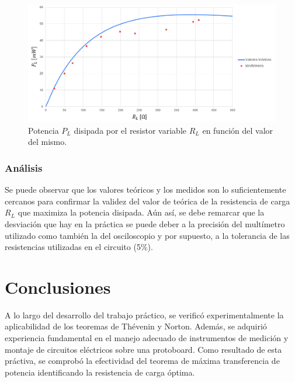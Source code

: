 \documentclass{article}
\begin{document}
            \begin{figure}[H]
                \centering
                \includegraphics[width=1\textwidth]{graficoPotencia.png}
                \caption{Potencia $P_L$ disipada por el resistor variable $R_L$ en función del valor del mismo.}
                \label{fig:graficoTransferenciaPotencia}
            \end{figure}

            

            \subsubsection{Análisis}
            \quad Se puede observar que los valores teóricos y los medidos son lo suficientemente cercanos para confirmar 
            la validez del valor de teórica de la resistencia de carga $R_L$ que maximiza la potencia disipada.
            Aún así, se debe remarcar que la desviación que hay en la práctica se puede deber a la precisión del multímetro utilizado como también la del osciloscopio
            y por supuesto, a la tolerancia de las resistencias utilizadas en el circuito (5\%).
    \section{Conclusiones}

    \quad A lo largo del desarrollo del trabajo práctico, se verificó experimentalmente
     la aplicabilidad de los teoremas de Thévenin y Norton. Además, se adquirió experiencia 
     fundamental en el manejo adecuado de instrumentos de medición y montaje de circuitos 
     eléctricos sobre una protoboard. Como resultado de esta práctiva, se comprobó la efectividad 
     del teorema de máxima transferencia de potencia identificando la resistencia de carga óptima.
\end{document}
